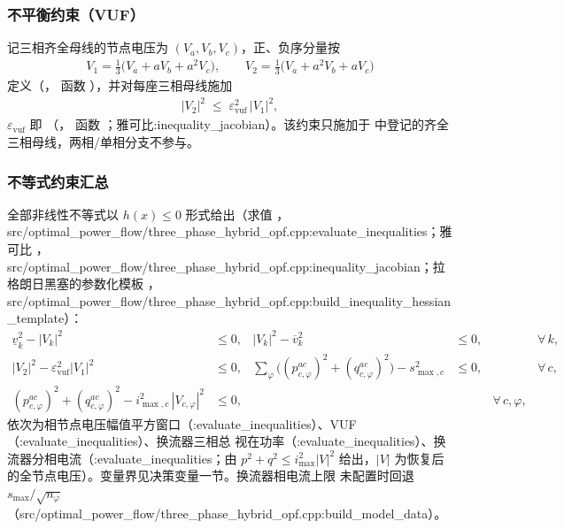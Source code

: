\subsubsection*{不平衡约束（VUF）}
记三相齐全母线的节点电压为 $(V_a,V_b,V_c)$，正、负序分量按
\begin{align*}
V_1 = \tfrac{1}{3}\bigl(V_a + aV_b + a^{2}V_c\bigr),\qquad
V_2 = \tfrac{1}{3}\bigl(V_a + a^{2}V_b + aV_c\bigr)
\end{align*}
定义（，
函数 ），并对每座三相母线施加
\begin{align*}
|V_2|^{2} \;\le\; \varepsilon_{\mathrm{vuf}}^{2}\,|V_1|^{2},
\end{align*}
$\varepsilon_{\mathrm{vuf}}$ 即 （，
函数 ；雅可比:inequality\_jacobian）。该约束只施加于
 中登记的齐全三相母线，两相/单相分支不参与。

\subsubsection*{不等式约束汇总}
全部非线性不等式以 $h(x)\le 0$ 形式给出（求值
，src/optimal\_power\_flow/three\_phase\_hybrid\_opf.cpp:evaluate\_inequalities；雅可比
，src/optimal\_power\_flow/three\_phase\_hybrid\_opf.cpp:inequality\_jacobian；拉格朗日黑塞的参数化模板
，src/optimal\_power\_flow/three\_phase\_hybrid\_opf.cpp:build\_inequality\_hessian\_template）：
\begin{align*}
\underline{v}_k^{2} - |V_k|^{2} &\le 0, &
|V_k|^{2} - \overline{v}_k^{2} &\le 0, &
&\forall\,k,\\
|V_2|^{2} - \varepsilon_{\mathrm{vuf}}^{2}|V_1|^{2} &\le 0, &
\sum_{\varphi}\bigl((p^{ac}_{c,\varphi})^{2}+(q^{ac}_{c,\varphi})^{2}\bigr) - s_{\max,c}^{2} &\le 0, &
&\forall\,c,\\
(p^{ac}_{c,\varphi})^{2}+(q^{ac}_{c,\varphi})^{2}
  - i_{\max,c}^{2}\,|V_{c,\varphi}|^{2} &\le 0, &
& &\forall\,c,\varphi,
\end{align*}
依次为相节点电压幅值平方窗口（:evaluate\_inequalities）、VUF（:evaluate\_inequalities）、换流器三相总
视在功率（:evaluate\_inequalities）、换流器分相电流（:evaluate\_inequalities；由 $p^2+q^2\le i_{\max}^2|V|^2$
给出，$|V|$ 为恢复后的全节点电压）。变量界见决策变量一节。换流器相电流上限
未配置时回退 $s_{\max}/\sqrt{n_{\varphi}}$（src/optimal\_power\_flow/three\_phase\_hybrid\_opf.cpp:build\_model\_data）。


